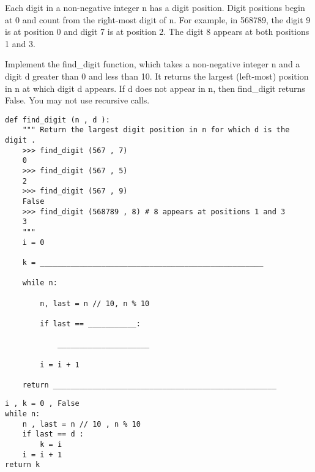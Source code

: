 \begin{blocksection}
\question Each digit in a non-negative integer n has a digit position. Digit positions begin at 0 and count from the right-most digit of n. For example, in 568789, the digit 9 is at position 0 and digit 7 is at position 2. The digit 8 appears at both positions 1 and 3. 

Implement the find\_digit function, which takes a non-negative integer n and a digit d greater than 0 and less than 10. It returns the largest (left-most) position in n at which digit d appears. If d does not appear in n, then find\_digit returns False. You may not use recursive calls.
\vspace{10}

\begin{lstlisting}
def find_digit (n , d ): 
    """ Return the largest digit position in n for which d is the digit . 
    >>> find_digit (567 , 7) 
    0 
    >>> find_digit (567 , 5) 
    2 
    >>> find_digit (567 , 9) 
    False 
    >>> find_digit (568789 , 8) # 8 appears at positions 1 and 3 
    3 
    """ 
    i = 0
    
    k = ___________________________________________________
    
    while n: 
    
        n, last = n // 10, n % 10 

        if last == ___________:

            _____________________
            
        i = i + 1 

    return ___________________________________________________

\end{lstlisting}
\begin{solution}[1.5in]
\begin{lstlisting}
i , k = 0 , False
while n:
    n , last = n // 10 , n % 10
    if last == d :
        k = i
    i = i + 1
return k
\end{lstlisting}
\end{solution}
\end{blocksection}
